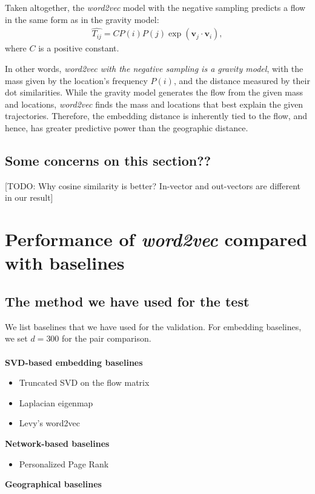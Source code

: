 \documentclass[12pt,a4paper]{article}
\newcommand{\todo}[1]{{\leavevmode\color{orange}[TODO: #1]}}
\begin{document}
Taken altogether, the {\it word2vec} model with the negative sampling predicts a flow in the same form as in the gravity model:
\begin{align}
	\hat{T_{ij}}=  C P(i) P(j)  \exp(\bm{v}_j \cdot \bm{v}_{i}), \label{eq:flow_w2v_ng0}
\end{align}
where $C$ is a positive constant.

In other words, \emph{word2vec with the negative sampling is a gravity model}, with the mass given by the location's frequency $P(i)$, and the distance measured by their dot similarities.
While the gravity model generates the flow from the given mass and locations, {\it word2vec} finds the mass and locations that best explain the given trajectories.
Therefore, the embedding distance is inherently tied to the flow, and hence, has greater predictive power than the geographic distance.

\subsection{Some concerns on this section??}
\todo{
Why cosine similarity is better? In-vector and out-vectors are different in our result}




\section{Performance of \textit{word2vec} compared with baselines}
\subsection{The method we have used for the test}
We list baselines that we have used for the validation. For embedding baselines, we set $d=300$ for the pair comparison.\\\\
\textbf{SVD-based embedding baselines}
\begin{itemize}
    \item Truncated SVD on the flow matrix
	\item  Laplacian eigenmap
	\item Levy's word2vec
\end{itemize}
\textbf{Network-based baselines}
\begin{itemize}
    \item Personalized Page Rank
\end{itemize}
\textbf{Geographical baselines}
\end{document}
